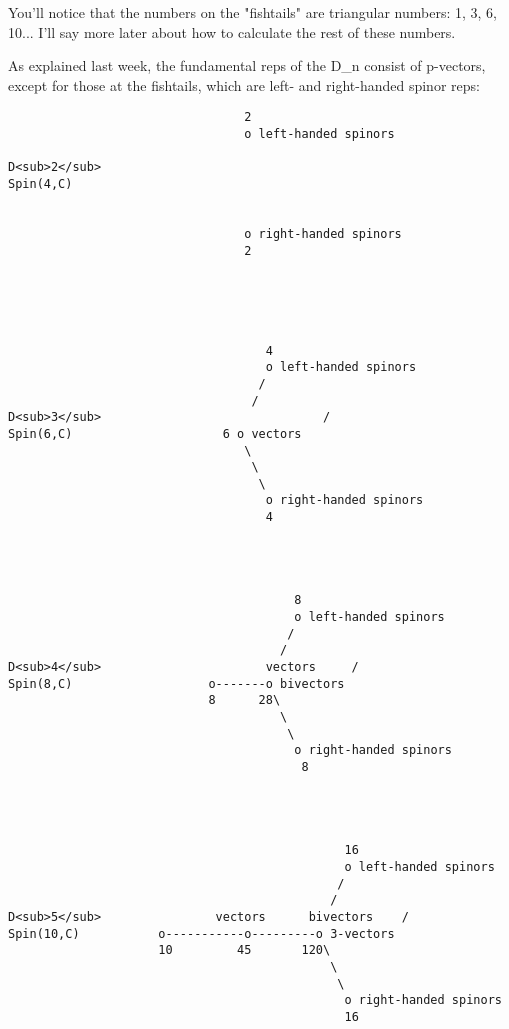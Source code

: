You'll notice that the numbers on the "fishtails" are triangular
numbers: 1, 3, 6, 10...  I'll say more later about how to calculate
the rest of these numbers.  

As explained last week, the fundamental reps of the D_{n} consist of
p-vectors, except for those at the fishtails, which are left- and
right-handed spinor reps:

                                
\begin{verbatim}
                                 2
                                 o left-handed spinors
                                 
D<sub>2</sub>                                      
Spin(4,C)                 
                 
                                    
                                 o right-handed spinors
                                 2
                               




                                    4
                                    o left-handed spinors
                                   /
                                  /
D<sub>3</sub>                               /
Spin(6,C)                     6 o vectors
                                 \
                                  \
                                   \
                                    o right-handed spinors
                                    4




                                        8
                                        o left-handed spinors
                                       /
                                      /
D<sub>4</sub>                       vectors     /
Spin(8,C)                   o-------o bivectors
                            8      28\
                                      \
                                       \
                                        o right-handed spinors
                                         8




                                               16
                                               o left-handed spinors
                                              /            
                                             / 
D<sub>5</sub>                vectors      bivectors    /
Spin(10,C)           o-----------o---------o 3-vectors
                     10         45       120\
                                             \
                                              \
                                               o right-handed spinors
                                               16

\end{verbatim}
    
